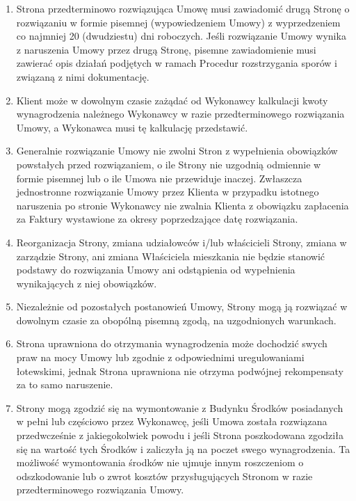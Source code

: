 \begin{multicols}{2}
\begin{enumerate}
	\item Strona przedterminowo rozwiązująca Umowę musi zawiadomić drugą Stronę o rozwiązaniu w formie pisemnej (wypowiedzeniem Umowy) z wyprzedzeniem co najmniej 20 (dwudziestu) dni roboczych. Jeśli rozwiązanie Umowy wynika z naruszenia Umowy przez drugą Stronę, pisemne zawiadomienie musi zawierać opis działań podjętych w ramach Procedur rozstrzygania sporów i związaną z nimi dokumentację.
	\item Klient może w dowolnym czasie zażądać od Wykonawcy kalkulacji kwoty wynagrodzenia należnego Wykonawcy w razie przedterminowego rozwiązania Umowy, a Wykonawca musi tę kalkulację przedstawić.
	\item Generalnie rozwiązanie Umowy nie zwolni Stron z wypełnienia obowiązków powstałych przed rozwiązaniem, o ile Strony nie uzgodnią odmiennie w formie pisemnej lub o ile Umowa nie przewiduje inaczej. Zwłaszcza jednostronne rozwiązanie Umowy przez Klienta w przypadku istotnego naruszenia po stronie Wykonawcy nie zwalnia Klienta z obowiązku zapłacenia za Faktury wystawione za okresy poprzedzające datę rozwiązania.
	\item Reorganizacja Strony, zmiana udziałowców i/lub właścicieli Strony, zmiana w zarządzie Strony, ani zmiana Właściciela mieszkania nie będzie stanowić podstawy do rozwiązania Umowy ani odstąpienia od wypełnienia wynikających z niej obowiązków.
	\item Niezależnie od pozostałych postanowień Umowy, Strony mogą ją rozwiązać w dowolnym czasie za obopólną pisemną zgodą, na uzgodnionych warunkach.
	\item Strona uprawniona do otrzymania wynagrodzenia może dochodzić swych praw na mocy Umowy lub zgodnie z odpowiednimi uregulowaniami łotewskimi, jednak Strona uprawniona nie otrzyma podwójnej rekompensaty za to samo naruszenie.
	\item Strony mogą zgodzić się na wymontowanie z Budynku Środków posiadanych w pełni lub częściowo przez Wykonawcę, jeśli Umowa została rozwiązana przedwcześnie z jakiegokolwiek powodu i jeśli Strona poszkodowana zgodziła się na wartość tych Środków i zaliczyła ją na poczet swego wynagrodzenia. Ta możliwość wymontowania środków nie ujmuje innym roszczeniom o odszkodowanie lub o zwrot kosztów przysługujących Stronom w razie przedterminowego rozwiązania Umowy.
\end{enumerate}


\end{multicols}
